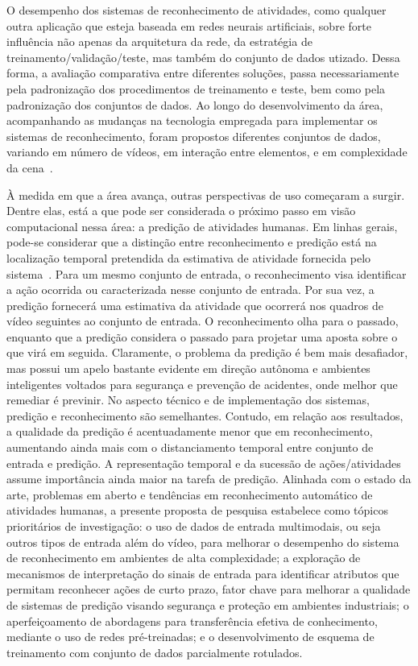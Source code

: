 O desempenho dos sistemas de reconhecimento de atividades, como qualquer outra aplicação que esteja baseada em redes neurais artificiais, sobre forte influência não apenas da arquitetura da rede, da estratégia de treinamento/validação/teste, mas também do conjunto de dados utizado. Dessa forma, a avaliação comparativa entre diferentes soluções, passa necessariamente pela padronização dos procedimentos de treinamento e teste, bem como pela padronização dos conjuntos de dados.  Ao longo do desenvolvimento da área, acompanhando as mudanças na tecnologia empregada para implementar os sistemas de reconhecimento, foram propostos diferentes conjuntos de dados, variando em número de vídeos, em interação entre elementos, e em complexidade da cena~\parencite{jegham-2020, kongr-2018}. 

À medida em que a área avança, outras perspectivas de uso começaram a surgir. Dentre elas, está a que pode ser considerada o próximo passo em visão computacional nessa área: a predição de atividades humanas. Em linhas gerais, pode-se considerar que a distinção entre reconhecimento e predição está na localização temporal pretendida da estimativa de atividade fornecida pelo sistema~\parencite{kongr-2018}. Para um mesmo conjunto de entrada, o reconhecimento visa identificar a ação ocorrida ou caracterizada nesse conjunto de entrada. Por sua vez, a predição fornecerá uma estimativa da atividade que ocorrerá nos quadros de vídeo seguintes ao conjunto de entrada. O reconhecimento olha para o passado, enquanto que a predição considera o passado para projetar uma aposta sobre o que virá em seguida. Claramente, o problema da predição é bem mais desafiador, mas possui um apelo bastante evidente em direção autônoma e ambientes inteligentes voltados para segurança e prevenção de acidentes, onde melhor que remediar é previnir. No aspecto técnico e de implementação dos sistemas, predição e reconhecimento são semelhantes. Contudo, em relação aos resultados, a qualidade da predição é acentuadamente menor que em reconhecimento, aumentando ainda mais com o distanciamento temporal entre conjunto de entrada e predição. A representação temporal e da sucessão de ações/atividades assume importância ainda maior na tarefa de predição.
Alinhada com o estado da arte, problemas em aberto e tendências em reconhecimento automático de atividades humanas, a presente proposta de pesquisa estabelece como tópicos prioritários de investigação: o uso de dados de entrada  multimodais, ou seja outros tipos de entrada além do vídeo, para melhorar o desempenho do sistema de reconhecimento em ambientes de alta complexidade; a exploração de mecanismos de interpretação do sinais de entrada para identificar atributos que permitam reconhecer ações de curto prazo, fator chave para melhorar a qualidade de sistemas de predição visando segurança e proteção em ambientes industriais; o aperfeiçoamento de abordagens para transferência efetiva de conhecimento, mediante o uso de redes pré-treinadas; e o desenvolvimento de esquema de treinamento com conjunto de dados parcialmente rotulados.
